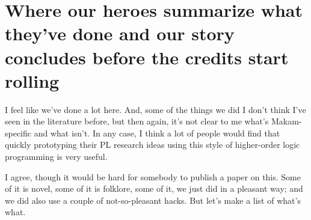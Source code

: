 \section{Where our heroes summarize what they've done and our story
concludes before the credits start
rolling}\label{where-our-heroes-summarize-what-theyve-done-and-our-story-concludes-before-the-credits-start-rolling}

\heroSTUDENT{} I feel like we've done a lot here. And, some of the things we
did I don't think I've seen in the literature before, but then again,
it's not clear to me what's Makam-specific and what isn't. In any case,
I think a lot of people would find that quickly prototyping their PL
research ideas using this style of higher-order logic programming is
very useful.

\heroADVISOR{} I agree, though it would be hard for somebody to publish a
paper on this. Some of it is novel, some of it is folklore, some of it,
we just did in a pleasant way; and we did also use a couple of
not-so-pleasant hacks. But let's make a list of what's what.

\vspace{-0.5em}

